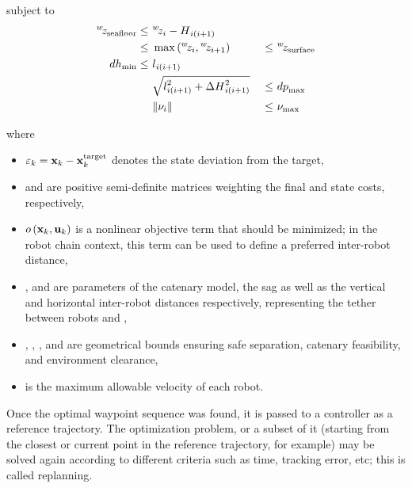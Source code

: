 subject to
\begin{alignat}{3}
	\ldcoord{z}{w}{\text{seafloor}} \leq & ~\ldcoord{z}{w}{i} - \ldscal{\catH{}}{i(i+1)}                            & ~     & \label{rcc_c_pp_constraints} \nonumber    \\
	\leq                                 & ~\max{\left(\ldcoord{z}{w}{i}, \ldcoord{z}{w}{i+1}\right)}               & ~\leq & ~\ldcoord{z}{w}{\text{surface}} \nonumber \\
	\ldscal{dh}{\text{min}}         \leq & ~\ldscal{\catl{}}{i(i+1)}                                                & ~     & ~\nonumber                                \\
	                                     & ~\sqrt{\llscal{\catl{}}{2}{i(i+1)} + \Delta \llscal{\catH{}}{2}{i(i+1)}} & ~\leq & ~\ldscal{dp}{\text{max}} \nonumber        \\
	                                     & ~\norm{\ldvect{\nu}{i}}                                                  & ~\leq & ~\ldvect{\nu}{\text{max}}
\end{alignat}

where
\begin{itemize}
	\item $\res{k} = \ldvect{x}{k} - \llvect{x}{\text{target}}{k}$ denotes the state deviation from the target,
	\item {} and  are positive semi-definite matrices weighting the final and state costs, respectively,
	\item $o\left(\ldvect{x}{k}, \ldvect{u}{k}\right)$ is a nonlinear objective term that should be minimized; in the robot chain context, this term can be used to define a preferred inter-robot distance,
	\item {},  and  are parameters of the catenary model, the sag as well as the vertical and horizontal inter-robot distances respectively, representing the tether between robots  and ,
	\item {}, , , and  are geometrical bounds ensuring safe separation, catenary feasibility, and environment clearance,
	\item {} is the maximum allowable velocity of each robot.
\end{itemize}

Once the optimal waypoint sequence was found, it is passed to a controller as a reference
trajectory. The optimization problem, or a subset of it (starting from the closest or current point
in the reference trajectory, for example) may be solved again according to different criteria such
as time, tracking error, etc; this is called replanning.

